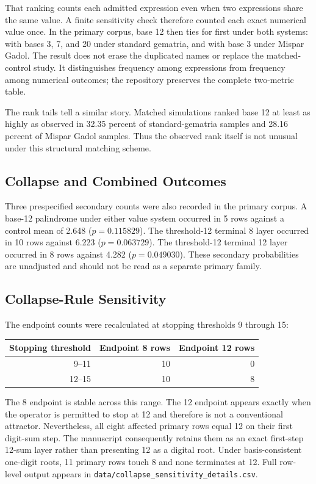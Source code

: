 That ranking counts each admitted expression even when two expressions share the same value. A finite sensitivity check therefore counted each exact numerical value once. In the primary corpus, base 12 then ties for first under both systems: with bases 3, 7, and 20 under standard gematria, and with base 3 under Mispar Gadol. The result does not erase the duplicated names or replace the matched-control study. It distinguishes frequency among expressions from frequency among numerical outcomes; the repository preserves the complete two-metric table.

The rank tails tell a similar story. Matched simulations ranked base 12 at least as highly as observed in 32.35 percent of standard-gematria samples and 28.16 percent of Mispar Gadol samples. Thus the observed rank itself is not unusual under this structural matching scheme.

\subsection{Collapse and Combined Outcomes}

Three prespecified secondary counts were also recorded in the primary corpus. A base-12 palindrome under either value system occurred in 5 rows against a control mean of 2.648 ($p=0.115829$). The threshold-12 terminal 8 layer occurred in 10 rows against 6.223 ($p=0.063729$). The threshold-12 terminal 12 layer occurred in 8 rows against 4.282 ($p=0.049030$). These secondary probabilities are unadjusted and should not be read as a separate primary family.

\subsection{Collapse-Rule Sensitivity}

The endpoint counts were recalculated at stopping thresholds 9 through 15:

\begin{center}
\begin{tabular}{rrr}
\toprule
Stopping threshold & Endpoint 8 rows & Endpoint 12 rows \\
\midrule
9--11 & 10 & 0 \\
12--15 & 10 & 8 \\
\bottomrule
\end{tabular}
\end{center}

The 8 endpoint is stable across this range. The 12 endpoint appears exactly when the operator is permitted to stop at 12 and therefore is not a conventional attractor. Nevertheless, all eight affected primary rows equal 12 on their first digit-sum step. The manuscript consequently retains them as an exact first-step 12-sum layer rather than presenting 12 as a digital root. Under basis-consistent one-digit roots, 11 primary rows touch 8 and none terminates at 12. Full row-level output appears in \texttt{data/collapse\_sensitivity\_details.csv}.

